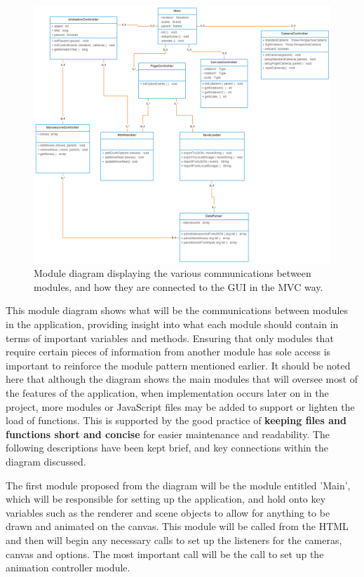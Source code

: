 \begin{figure}[h]
  \centering
      \includegraphics[width=1\textwidth]{images/mod.png}
  \caption{Module diagram displaying the various communications between modules, and how they are connected to the GUI in the MVC way.}
  \label{fig:mod}
\end{figure}

This module diagram shows what will be the communications between modules in the application, providing insight into what each module should contain in terms of important variables and methods. Ensuring that only modules that require certain pieces of information from another module has sole access is important to reinforce the module pattern mentioned earlier. It should be noted here that although the diagram shows the main modules that will oversee most of the features of the application, when implementation occurs later on in the project, more modules or JavaScript files may be added to support or lighten the load of functions. This is supported by the good practice of \textbf{keeping files and functions short and concise} for easier maintenance and readability. The following descriptions have been kept brief, and key connections within the diagram discussed.

The first module proposed from the diagram will be the module entitled 'Main', which will be responsible for setting up the application, and hold onto key variables such as the renderer and scene objects to allow for anything to be drawn and animated on the canvas. This module will be called from the HTML and then will begin any necessary calls to set up the listeners for the cameras, canvas and options. The most important call will be the call to set up the animation controller module. 

